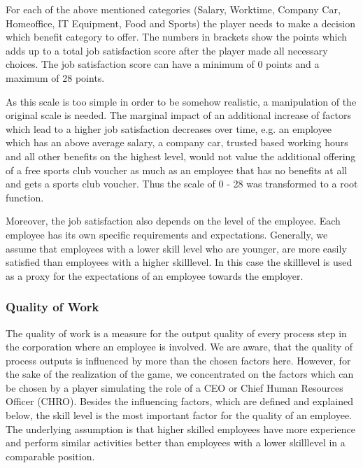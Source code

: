 For each of the above mentioned categories (Salary, Worktime, Company Car, Homeoffice, IT Equipment, Food and Sports) the player needs to make a decision which benefit category to offer. The numbers in brackets show the points which adds up to a total job satisfaction score after the player made all necessary choices. The job satisfaction score can have a minimum of 0 points and a maximum of 28 points.

As this scale is too simple in order to be somehow realistic, a manipulation of the original scale is needed. The marginal impact of an additional increase of factors which lead to a higher job satisfaction decreases over time, e.g. an employee which has an above average salary, a company car, trusted based working hours and all other benefits on the highest level, would not value the additional offering of a free sports club voucher as much as an employee that has no benefits at all and gets a sports club voucher. Thus the scale of 0 - 28 was transformed to a root function.

Moreover, the job satisfaction also depends on the level of the employee. Each employee has its own specific requirements and expectations. Generally, we assume that employees with a lower skill level who are younger, are more easily satisfied than employees with a higher skilllevel. In this case the skilllevel  is used as a proxy for the expectations of an employee towards the employer. 


\subsubsection{Quality of Work}
The quality of work is a measure for the output quality of every process step in the corporation where an employee is involved. We are aware, that the quality of process outputs is influenced by more than the chosen factors here. However, for the sake of the realization of the game, we concentrated on the factors which can be chosen by a player simulating the role of a CEO or Chief Human Resources Officer (CHRO). Besides the influencing factors, which are defined and explained below, the skill level is the most important factor for the quality of an employee. The underlying assumption is that higher skilled employees have more experience and perform similar activities better than employees with a lower skilllevel in a comparable position.

